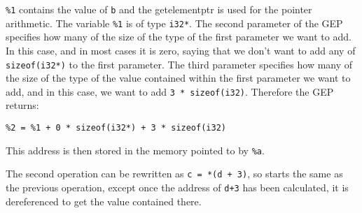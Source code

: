 \verb!%1! contains the value of \verb!b! and the getelementptr is used for the pointer arithmetic.
The variable \verb!%1! is of type \verb!i32*!.
The second parameter of the GEP specifies how many of the size of the type of the first parameter we want to add.
In this case, and in most cases it is zero, saying that we don't want to add any of \verb!sizeof(i32*)! to the first parameter.
The third parameter specifies how many of the size of the type of the value contained within the first parameter we want to add, and in this case, we want to add \verb!3 * sizeof(i32)!.
Therefore the GEP returns:

\begin{verbatim}
%2 = %1 + 0 * sizeof(i32*) + 3 * sizeof(i32)
\end{verbatim}

This address is then stored in the memory pointed to by \verb!%a!.

The second operation can be rewritten as \verb!c = *(d + 3)!, so starts the same as the previous operation, except once the address of \verb!d+3! has been calculated, it is dereferenced to get the value contained there.

